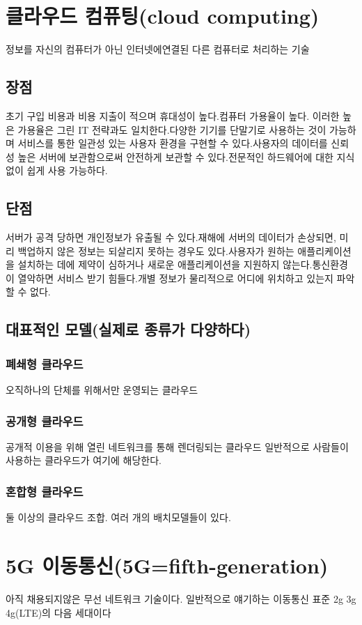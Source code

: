 \documentclass{oblivoir}
\begin{document}
\section{클라우드 컴퓨팅(cloud computing)}
정보를 자신의 컴퓨터가 아닌 인터넷에연결된 다른 컴퓨터로 처리하는 기술
\subsection{장점}
초기 구입 비용과 비용 지출이 적으며 휴대성이 높다.\nuwline 컴퓨터 가용율이 높다. 이러한 높은 가용율은 그린 IT 전략과도 일치한다.\nuwline 다양한 기기를 단말기로 사용하는 것이 가능하며 서비스를 통한 일관성 있는 사용자 환경을 구현할 수 있다.\nuwline 사용자의 데이터를 신뢰성 높은 서버에 보관함으로써 안전하게 보관할 수 있다.\nuwline 전문적인 하드웨어에 대한 지식 없이 쉽게 사용 가능하다.

\subsection{단점}
서버가 공격 당하면 개인정보가 유출될 수 있다.\nuwline 재해에 서버의 데이터가 손상되면, 미리 백업하지 않은 정보는 되살리지 못하는 경우도 있다.\nuwline 사용자가 원하는 애플리케이션을 설치하는 데에 제약이 심하거나 새로운 애플리케이션을 지원하지 않는다.\nuwline 통신환경이 열악하면 서비스 받기 힘들다.\nuwline 개별 정보가 물리적으로 어디에 위치하고 있는지 파악할 수 없다.

\subsection{대표적인 모델(실제로 종류가 다양하다)}
\subsubsection{폐쇄형 클라우드}
오직하나의 단체를 위해서만 운영되는 클라우드
\subsubsection{공개형 클라우드}
공개적 이용을 위해 열린 네트워크를 통해 렌더링되는 클라우드 일반적으로 사람들이 사용하는 클라우드가 여기에 해당한다.
\subsubsection{혼합형 클라우드}
둘 이상의 클라우드 조합. 여러 개의 배치모델들이 있다.

\section{5G 이동통신(5G=fifth-generation)}
아직 채용되지않은 무선 네트워크 기술이다. 일반적으로 얘기하는 이동통신 표준 2g 3g 4g(LTE)의 다음 세대이다
\end{document}
